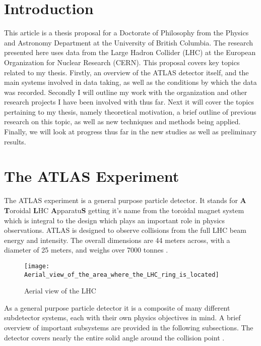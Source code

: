 \documentclass[12pt]{article}
\begin{document}

\newpage

\newpage
\section{Introduction}
This article is a thesis proposal for a Doctorate of Philosophy from the Physics
and Astronomy Department at the University of British Columbia. The research
presented here uses data from the Large Hadron Collider (LHC) at the European
Organization for Nuclear Research (CERN). This proposal covers key topics
related to my thesis. Firstly, an overview of the ATLAS detector itself, and the
main systems involved in data taking, as well as the conditions by which the
data was recorded. Secondly I will outline my work with the organization and
other research projects I have been involved with thus far. Next it will cover
the topics pertaining to my thesis, namely theoretical motivation, a brief
outline of previous research on this topic, as well as new techniques and
methods being applied. Finally, we will look at progress thus far in the new
studies as well as preliminary results.

\section{The ATLAS Experiment}
The ATLAS experiment is a general purpose particle detector. It stands for
\textbf{A} \textbf{T}oroidal \textbf{L}HC \textbf{A}pparatu\textbf{S} getting
it's name from the toroidal magnet system which is integral to the design which
plays an important role in physics observations. ATLAS is designed to observe
collisions from the full LHC beam energy and intensity. The overall dimensions
are 44 meters across, with a diameter of 25 meters, and weighs over 7000 tonnes
\cite{Aad_2024}. \begin{wrapfigure}{l}{0.42\textwidth}
    \centering
    \texttt{[image: Aerial\_view\_of\_the\_area\_where\_the\_LHC\_ring\_is\_located]}
    \caption{Aerial view of the LHC}
    \label{fig:aerial_view}
\end{wrapfigure} As a general purpose particle detector it is a composite of
many different subdetector systems, each with their own physics objectives in
mind. A brief overview of important subsystems are provided in the following
subsections. The detector covers nearly the entire solid angle around the
collision point \cite{The_ATLAS_Collaboration_2008}. 
\end{document}
